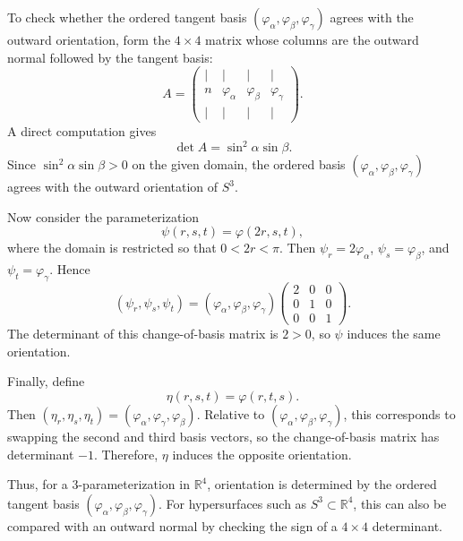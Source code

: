 \begin{example}
To check whether the ordered tangent basis $(\varphi_\alpha,\varphi_\beta,\varphi_\gamma)$ agrees with the outward orientation, form the $4 \times 4$ matrix whose columns are the outward normal followed by the tangent basis:
\begin{equation}
A =
\begin{pmatrix}
| & | & | & | \\
n & \varphi_\alpha & \varphi_\beta & \varphi_\gamma \\
| & | & | & |
\end{pmatrix}.
\end{equation}
A direct computation gives
\begin{equation}
\det A
=
\sin^2\alpha \sin\beta.
\end{equation}
Since $\sin^2\alpha\sin\beta>0$ on the given domain, the ordered basis $(\varphi_\alpha,\varphi_\beta,\varphi_\gamma)$ agrees with the outward orientation of $S^3$.

Now consider the parameterization
\begin{equation}
\psi(r,s,t)
=
\varphi(2r,s,t),
\end{equation}
where the domain is restricted so that $0<2r<\pi$. Then $\psi_r=2\varphi_\alpha$, $\psi_s=\varphi_\beta$, and $\psi_t=\varphi_\gamma$. Hence
\begin{equation}
(\psi_r,\psi_s,\psi_t)
=
(\varphi_\alpha,\varphi_\beta,\varphi_\gamma)
\begin{pmatrix}
2 & 0 & 0 \\
0 & 1 & 0 \\
0 & 0 & 1
\end{pmatrix}.
\end{equation}
The determinant of this change-of-basis matrix is $2>0$, so $\psi$ induces the same orientation.

Finally, define
\begin{equation}
\eta(r,s,t)
=
\varphi(r,t,s).
\end{equation}
Then $(\eta_r,\eta_s,\eta_t)=(\varphi_\alpha,\varphi_\gamma,\varphi_\beta)$. Relative to $(\varphi_\alpha,\varphi_\beta,\varphi_\gamma)$, this corresponds to swapping the second and third basis vectors, so the change-of-basis matrix has determinant $-1$. Therefore, $\eta$ induces the opposite orientation.

Thus, for a $3$-parameterization in $\mathbb{R}^4$, orientation is determined by the ordered tangent basis $(\varphi_\alpha,\varphi_\beta,\varphi_\gamma)$. For hypersurfaces such as $S^3 \subset \mathbb{R}^4$, this can also be compared with an outward normal by checking the sign of a $4 \times 4$ determinant.
\end{example}

